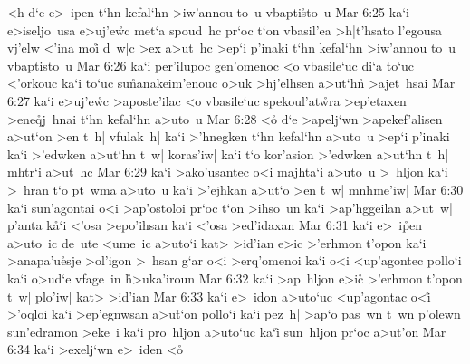 <h
d`e
e>~ipen
t`hn
kefal`hn
>iw'annou
to~u
vbapti\r{s}to~u\bibvsend
{}
\vs Mar 6:25
ka`i
e>iseljo~usa
e>uj'e\r{w}c
met`a
spoud~hc
pr`oc
t`on
vbasil'ea
>h|t'hsato
l'egousa
vj'elw
<'ina
moi\r{}
d~w|c
>ex
a>ut~hc
>ep`i
p'inaki
t`hn
kefal`hn
>iw'annou
to~u
vbaptisto~u\bibvsend
\vs Mar 6:26
ka`i
per'ilupoc
gen'omenoc
<o
vbasile`uc
di`a
to`uc
<'orkouc
ka`i
to`uc
su\r{n}anakeim'enouc
o>uk
>hj'elhsen
a>ut`hn\r{}
>ajet~hsai\bibvsend
\vs Mar 6:27
ka`i
e>uj'e\r{w}c
>aposte'ilac
<o
vbasile`uc
spekoul'at\r{w}ra
>ep'etaxen
>ene\r{q}j~hnai
t`hn
kefal`hn
a>uto~u\bibvsend
\vs Mar 6:28
<o\r{}
d`e
>apelj`wn
>apekef'alisen
a>ut`on
>en
t~h|
vfulak~h|
ka`i
>'hnegken
t`hn
kefal`hn
a>uto~u
>ep`i
p'inaki
ka`i
>'edwken
a>ut`hn
t~w|
koras'iw|
ka`i
t`o
kor'asion
>'edwken
a>ut`hn
t~h|
mhtr`i
a>ut~hc\bibvsend
\vs Mar 6:29
ka`i
>ako'usantec
o<i
majhta`i
a>uto~u
>~hljon
ka`i
>~hran
t`o
pt~wma
a>uto~u
ka`i
>'ejhkan
a>ut`o
>en
\r{t}~w|
mnhme'iw|\bibvsend
\vs Mar 6:30
ka`i
sun'agontai
o<i
>ap'ostoloi
pr`oc
t`on
>ihso~un
ka`i
>ap'hggeilan
a>ut~w|
p'anta
k\r{a}`i
<'osa
>epo'ihsan
ka`i
<'osa
>ed'idaxan\bibvsend
\vs Mar 6:31
ka`i
e>~i\r{p}en
a>uto~ic
de~ute
<ume~ic
a>uto`i
kat>
>id'ian
e>ic
>'erhmon
t'opon
ka`i
>anapa'u\r{e}sje
>ol'igon
>~hsan
g`ar
o<i
>erq'omenoi
ka`i
o<i
<up'agontec
pollo`i
ka`i
o>ud`e
vfage~in
\r{h}>uka'iroun\bibvsend
{}
\vs Mar 6:32
ka`i
>ap~hljon
e>ic\r{}
>'erhmon
t'opon
t~w|
plo'iw|
kat>
>id'ian\bibvsend
\vs Mar 6:33
ka`i
e>~idon
a>uto`uc
<up'agontac
o<i\r{}
>'oqloi
ka`i
>ep'egnwsan
a>u\r{t}`on
pollo`i
ka`i
pez~h|
>ap`o
pas~wn
t~wn
p'olewn
sun'edramon
>eke~i
ka`i
pro~hljon
a>uto`uc
ka`i\r{}
sun~hljon
pr`oc
a>ut'on\bibvsend
\vs Mar 6:34
ka`i
>exelj`wn
e>~iden
<o\r{}
